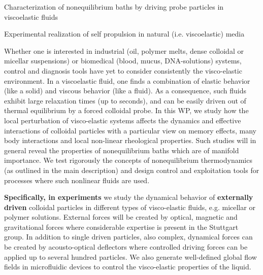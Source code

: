 \begin{workpackage}[id=WPbrown,wphases=0-48,
  short=Brown. particles, %
  title=Brownian particles in nonequilibrium baths, %
  lead=USTUTT,
  USTUTTRM=96,KULRM=6,ULEIRM=6,UNIPDRM=6]

\newrefsection

\begin{mdframed}
\mobjectives
%
\begin{compactitem}
\item Characterization of nonequilibrium baths by driving probe particles in viscoelastic fluids
\item Experimental realization of self propulsion in natural (i.e. viscoelastic) media
  \end{compactitem}

\mdescription
%
Whether one is interested in industrial (oil, polymer melts, dense colloidal or micellar
suspensions) or biomedical (blood, mucus, DNA-solutions) systems, control and diagnosis
tools have yet to consider consistently the visco-elastic environment.
%
In a viscoelastic fluid, one finds a combination of elastic behavior (like a solid) and
viscous behavior (like a fluid).
%
As a consequence, such fluids exhibit large relaxation times (up to seconds), and can be
easily driven out of thermal equilibrium by a forced colloidal probe.
%
In this WP, we study how the local perturbation of visco-elastic systems affects the
dynamics and effective interactions of colloidal particles with a particular view on memory
effects, many body interactions and local non-linear rheological properties. Such studies
will in general reveal the properties of nonequilibrium baths which are of manifold
importance.
%
We test rigorously the concepts of nonequilibrium thermodynamics (as outlined in the
main description) and design control and exploitation tools for processes where such
nonlinear fluids are used.

{\bf Specifically, in experiments} we study the dynamical behavior of {\bf externally driven} colloidal particles in different types of visco-elastic
fluids, e.g. micellar or polymer solutions. External forces will be created by optical, magnetic and gravitational forces where considerable expertise is present in the Stuttgart group. In addition to single driven particles, also complex, dynamical forces can be created by acousto-optical deflectors where controlled driving forces can be applied up to several hundred particles.
%
We also generate well-defined global flow fields in microfluidic devices \cite{scholz2012}
to control the visco-elastic properties of the liquid.


\end{mdframed}
\end{workpackage}
